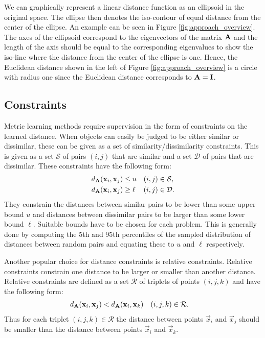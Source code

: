 We can graphically represent a linear distance function as an ellipsoid in the original space. The ellipse then denotes the iso-contour of equal distance from the center of the ellipse. An example can be seen in Figure \ref{fig:approach_overview}. The axes of the ellipsoid correspond to the eigenvectors of the matrix $\mathbf{A}$ and the length of the axis should be equal to the corresponding eigenvalues to show the iso-line where the distance from the center of the ellipse is one. Hence, the Euclidean distance shown in the left of Figure \ref{fig:approach_overview} is a circle with radius one since the Euclidean distance corresponds to $\mathbf{A} = \mathbf{I}$. 



\subsection{Constraints}
\label{sec:background_constraints}

Metric learning methods require supervision in the form of constraints on the learned distance. When objects can easily be judged to be either similar or dissimilar, these can be given as a set of similarity/dissimilarity constraints. This is given as a set $\mathcal{S}$ of pairs $(i, j)$ that are similar and a set $\mathcal{D}$ of pairs that are dissimilar. These constraints have the following form:
\begin{subequations}
\begin{align}
d_{\mathbf{A}}(\mathbf{x}_i, \mathbf{x}_j) &\leq u & (i, j) &\in \mathcal{S}, \\
d_{\mathbf{A}}(\mathbf{x}_i, \mathbf{x}_j) &\geq \ell & (i, j) &\in \mathcal{D}.
\end{align}
\end{subequations}
They constrain the distances between similar pairs to be lower than some upper bound $u$ and distances between dissimilar pairs to be larger than some lower bound $\ell$. Suitable bounds have to be chosen for each problem. This is generally done by computing the 5th and 95th percentiles of the sampled distribution of distances between random pairs and equating these to  $u$ and $\ell$ respectively.

Another popular choice for distance constraints is relative constraints. Relative constraints constrain one distance to be larger or smaller than another distance. Relative constraints are defined as a set $\mathcal{R}$ of triplets of points $(i,j,k)$ and have the following form:
\begin{align}
d_{\mathbf{A}}(\mathbf{x}_i, \mathbf{x}_j) &< d_{\mathbf{A}}(\mathbf{x}_i, \mathbf{x}_k) & (i, j, k) &\in \mathcal{R}.
\end{align}
Thus for each triplet $(i,j,k) \in \mathcal{R}$ the distance between points $\vec{x}_i$ and $\vec{x}_j$ should be smaller than the distance between points $\vec{x}_i$ and $\vec{x}_k$.

